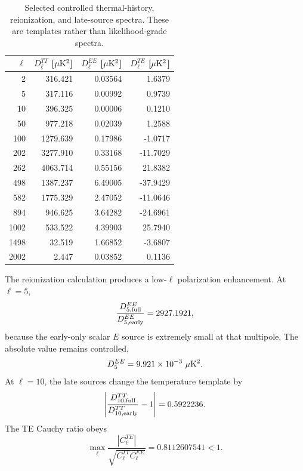 \begin{table}[htbp]
\centering
\small
\begin{tabular}{rrrr}
\toprule
$\ell$ & $D_\ell^{TT}$ [$\mu{\rm K}^2$] & $D_\ell^{EE}$ [$\mu{\rm K}^2$] & $D_\ell^{TE}$ [$\mu{\rm K}^2$]\\
\midrule
2    & 316.421 & 0.03564 & 1.6379\\
5    & 317.116 & 0.00992 & 0.9739\\
10   & 396.325 & 0.00006 & 0.1210\\
50   & 977.218 & 0.02039 & 1.2588\\
100  & 1279.639 & 0.17986 & -1.0717\\
202  & 3277.910 & 0.33168 & -11.7029\\
262  & 4063.714 & 0.55156 & 21.8382\\
498  & 1387.237 & 6.49005 & -37.9429\\
582  & 1775.329 & 2.47052 & -11.0646\\
894  & 946.625 & 3.64282 & -24.6961\\
1002 & 533.522 & 4.39903 & 25.7940\\
1498 & 32.519 & 1.66852 & -3.6807\\
2002 & 2.447 & 0.03852 & 0.1136\\
\bottomrule
\end{tabular}
\caption{Selected controlled thermal-history, reionization, and late-source spectra.  These are templates rather than likelihood-grade spectra.}
\label{tab:trl-selected-spectra}
\end{table}

The reionization calculation produces a low-$\ell$ polarization enhancement.  At $\ell=5$,
\begin{equation}
\frac{D_{5,\rm full}^{EE}}{D_{5,\rm early}^{EE}}
=2927.1921,
\label{eq:trl-ee-enhancement}
\end{equation}
because the early-only scalar $E$ source is extremely small at that multipole.  The absolute value remains controlled,
\begin{equation}
D_5^{EE}=9.921\times10^{-3}\ \mu{\rm K}^2.
\label{eq:trl-ee-absolute}
\end{equation}
At $\ell=10$, the late sources change the temperature template by
\begin{equation}
\left|
\frac{D_{10,\rm full}^{TT}}{D_{10,\rm early}^{TT}}-1
\right|
=0.5922236.
\label{eq:trl-lowell-tt}
\end{equation}
The TE Cauchy ratio obeys
\begin{equation}
\boxed{
\max_\ell
\frac{|C_\ell^{TE}|}{\sqrt{C_\ell^{TT}C_\ell^{EE}}}
=0.8112607541<1.
}
\label{eq:trl-te-cauchy}
\end{equation}

